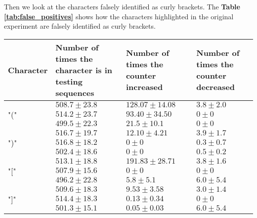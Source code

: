 Then we look at the characters falsely identified as curly brackets. The \textbf{Table \ref{tab:false_positives}} shows how the characters highlighted in the original experiment are falsely identified as curly brackets.

\begin{table}[!ht]
    \centering
    \begin{tabular}{|C{15mm}|C{32mm}|C{32mm}|C{32mm}|}
        \hline
        Character & Number of times the character is in testing sequences & Number of times the counter increased & Number of times the counter decreased \\ \hline \hline
        
         & \textcolor{mygreen}{$508.7 \pm 23.8$} & \textcolor{mygreen}{$128.07 \pm 14.08$} & \textcolor{mygreen}{$3.8 \pm 2.0$} \\
        & \textcolor{mygreen2}{$514.2 \pm 23.7$} & \textcolor{mygreen2}{$93.40 \pm 34.50$} & \textcolor{mygreen2}{$0 \pm 0$} \\
        & $499.5 \pm 22.3$ & $21.5 \pm 10.1$ & $0 \pm 0$ \\ \hline
        
         & \textcolor{mygreen}{$516.7 \pm 19.7$} & \textcolor{mygreen}{$12.10 \pm 4.21$} & \textcolor{mygreen}{$3.9 \pm 1.7$} \\
        & \textcolor{mygreen2}{$516.8 \pm 18.2$} & \textcolor{mygreen2}{$0 \pm 0$} & \textcolor{mygreen2}{$0.3 \pm 0.7$}\\
        & $502.4 \pm 18.6$ & $0 \pm 0$ &  $0.5 \pm 0.2$ \\ \hline
        
        \multirow{3}{*}{"["} & \textcolor{mygreen}{$513.1 \pm 18.8$} & \textcolor{mygreen}{$191.83 \pm 28.71$} & \textcolor{mygreen}{$3.8 \pm 1.6$} \\
        & \textcolor{mygreen2}{$507.9 \pm 15.6$} & \textcolor{mygreen2}{$0 \pm 0$} & \textcolor{mygreen2}{$0 \pm 0$}\\
        & $496.2 \pm 22.8$ & $5.8 \pm 5.1$ & $6.0 \pm 5.4$ \\ \hline
        
        \multirow{3}{*}{"]"} & \textcolor{mygreen}{$509.6 \pm 18.3$} & \textcolor{mygreen}{$9.53 \pm 3.58$} & \textcolor{mygreen}{$3.0 \pm 1.4$}\\
        & \textcolor{mygreen2}{$514.4 \pm 18.3$} & \textcolor{mygreen2}{$0.13 \pm 0.34$} & \textcolor{mygreen2}{$0 \pm 0$}\\
        & $501.3 \pm 15.1$ & $0.05 \pm 0.03$ & $6.0 \pm 5.4$ \\ \hline
        

\end{tabular}
\end{table}
